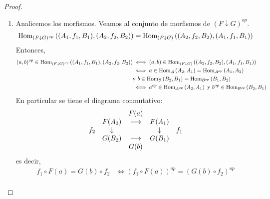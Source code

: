 \documentclass[12pt]{report}
\theoremstyle{largebreak}
\newcommand{\Hom}[3]{\ensuremath{\textup{Hom}_{#1}\left(#2,#3\right)}}
\begin{document}
\begin{proof}
\begin{enumerate}
            \item Analicemos los morfismos. Veamos al conjunto de morfismos de $(F\downarrow G)^{op}$.
            \begin{equation*}
                \begin{split}
                    \Hom{(F\downarrow G)^{op}}{(A_1,f_1,B_1)}{(A_2,f_2,B_2)}&=\Hom{(F\downarrow G)}{(A_2,f_2,B_2)}{(A_1,f_1,B_1)}\\
                \end{split}
            \end{equation*}
            Entonces,
            \begin{equation*}
                \begin{split}
                    (a,b)^{op}\in\Hom{(F\downarrow G)^{op}}{(A_1,f_1,B_1)}{(A_2,f_2,B_2)}&\iff (a,b)\in\Hom{(F\downarrow G)}{(A_2,f_2,B_2)}{(A_1,f_1,B_1)}\\
                    &\iff a\in\Hom{\mathcal{A}}{A_2}{A_1}=\Hom{\mathcal{A}^{op}}{A_1}{A_2}\\
                    &\textup{y }b\in\Hom{\mathcal{B}}{B_2}{B_1}=\Hom{\mathcal{B}^{op}}{B_1}{B_2}\\
                    &\iff a^{op}\in\Hom{\mathcal{A}^{op}}{A_2}{A_1}\textup{ y }b^{op}\in\Hom{\mathcal{B}^{op}}{B_2}{B_1}\\
                \end{split}
            \end{equation*}
            En particular se tiene el diagrama conmutativo:
            \begin{equation*}
                \begin{array}[pos]{lcccr}
                    & & F(a) & & \\
                    & F(A_2) & \longrightarrow & F(A_1) & \\
                    f_2 & \downarrow & & \downarrow & f_1\\
                    & G(B_2) & \longrightarrow & G(B_1) & \\
                    & & G(b) & & \\
                \end{array}
            \end{equation*}
            es decir,
            \begin{equation*}
                \begin{split}
                    f_1\circ F(a)=G(b)\circ f_2&\iff (f_1\circ F(a))^{op}=(G(b)\circ f_2)^{op}\\

\end{split}
\end{equation*}
\end{enumerate}
\end{proof}
\end{document}
